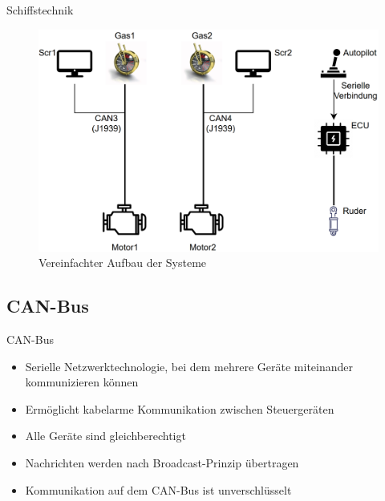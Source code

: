 \documentclass[usenames, dvipsnames, aspectratio=75]{beamer}
\begin{document}
\begin{frame}{Schiffstechnik}
    \begin{figure}
        \centering
        \includegraphics[width=0.9\linewidth]{assets/limandaSystem.png}
        \caption{Vereinfachter Aufbau der Systeme}
    \end{figure}
\end{frame}

\subsection{CAN-Bus}
\begin{frame}{CAN-Bus}
    \begin{itemize}
        \item Serielle Netzwerktechnologie, bei dem mehrere Geräte miteinander kommunizieren können
        \item Ermöglicht kabelarme Kommunikation zwischen Steuergeräten
        \item Alle Geräte sind gleichberechtigt
        \item Nachrichten werden nach Broadcast-Prinzip übertragen
        \item Kommunikation auf dem CAN-Bus ist unverschlüsselt
    \end{itemize}
\end{frame}
\end{document}
